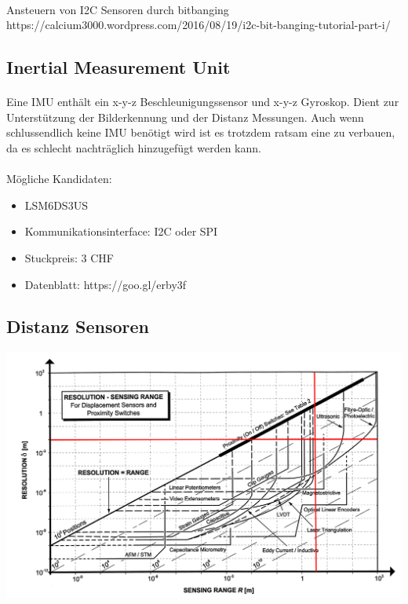\documentclass[a4paper]{report}
\begin{document}
\paragraph{} Ansteuern von I2C Sensoren durch bitbanging
https://calcium3000.wordpress.com/2016/08/19/i2c-bit-banging-tutorial-part-i/

\subsection{Inertial Measurement Unit}
\paragraph{} Eine IMU enthält ein x-y-z Beschleunigungssensor und x-y-z
Gyroskop. Dient zur Unterstützung der Bilderkennung und der Distanz
Messungen. Auch wenn schlussendlich keine IMU benötigt wird ist es trotzdem
ratsam eine zu verbauen, da es schlecht nachträglich hinzugefügt werden kann.

\paragraph{} Mögliche Kandidaten:
\begin{itemize}
\item LSM6DS3US
\item Kommunikationsinterface: I2C oder SPI
\item Stuckpreis: 3 CHF
\item Datenblatt: https://goo.gl/erby3f
\end{itemize}

\subsection{Distanz Sensoren}
\includegraphics[width=\textwidth]{distance-sensors}
\end{document}
